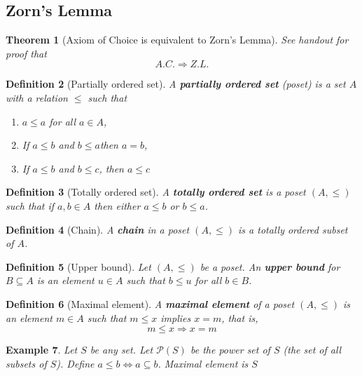 \documentclass[12pt, oneside, a4paper]{article}
\newtheorem{thm}{Theorem}[section]
\theoremstyle{dfn}
\newtheorem{dfn}[thm]{Definition}
\newtheorem{ex}[thm]{Example}
\begin{document}

\subsection{Zorn's Lemma} %
\label{sub:zorn_s_lemma}

\begin{thm}[Axiom of Choice is equivalent to Zorn's Lemma]
    See handout for proof that \[
        A.C. \Rightarrow Z.L.
    \]
\end{thm}

\begin{dfn}[Partially ordered set]
    A \textbf{partially ordered set} (poset) is a set $A$ with a relation $\leq$ such that 
    \begin{enumerate}[(1)]
        \item $ a \leq a$ for all $a \in A$,
        \item If $a \leq b$ and $b \leq a$then $a = b$,
        \item If $a \leq b$ and $b \leq c$, then $a \leq c$
    \end{enumerate}
\end{dfn}

\begin{dfn}[Totally ordered set]
    A \textbf{totally ordered set} is a poset $(A, \leq)$ such that if $a, b \in A$ then either $a \leq b$ or $b \leq a$.
\end{dfn}

\begin{dfn}[Chain]
    A \textbf{chain} in a poset $(A, \leq)$ is a totally ordered subset of $A$.
\end{dfn}

\begin{dfn}[Upper bound]
    Let $(A, \leq)$ be a poset.  An \textbf{upper bound} for $B \subseteq A$ is an element $u \in A$ such that $b \leq u$ for all $ b \in B$.  
\end{dfn}

\begin{dfn}[Maximal element]
    A \textbf{maximal element} of a poset $(A, \leq)$ is an element $m \in A$ such that $m \leq x$ implies $x = m$, that is, \[
        m \leq x \Rightarrow x = m
    \]
\end{dfn}

\begin{ex}
    Let $S$ be any set.  Let $\mathcal{P}(S)$ be the power set of $S$ (the set of all subsets of $S$).  Define $a \leq b \iff a \subseteq b$.  Maximal element is $S$
\end{ex}
\end{document}
